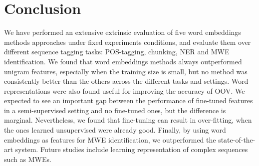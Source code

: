 \section{Conclusion}
We have performed an extensive extrinsic evaluation of five word embeddings methods approaches
under fixed experiments conditions, and evaluate them over different sequence tagging tasks: POS-tagging, chunking, NER and MWE identification.
We found that word embeddings methods always outperformed unigram features, especially when the training size is small, but no method was consistently better than the others across the different tasks and settings.
Word representations were also found useful for improving the accuracy of OOV.
We expected to see an important gap between the performance of fine-tuned features in a semi-supervised setting and no fine-tuned ones, but the difference is marginal.
Nevertheless, we found that fine-tuning can result in over-fitting, when the ones learned  unsupervised were already good.   
Finally, by using word embeddings as features for MWE identification, we outperformed 
the state-of-the-art system.
Future studies include learning representation of complex sequences such as MWEs.


